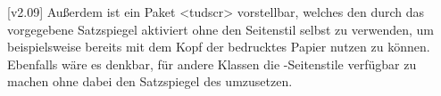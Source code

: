 [v2.09]
Außerdem ist ein Paket <tudscr> vorstellbar, welches
den durch das \CD vorgegebene Satzspiegel aktiviert ohne den Seitenstil selbst 
zu verwenden, um beispielsweise bereits mit dem Kopf der \TnUD bedrucktes 
Papier nutzen zu können. Ebenfalls wäre es denkbar, für andere Klassen die 
-Seitenstile verfügbar zu machen ohne dabei den 
Satzspiegel des \CDs umzusetzen.
